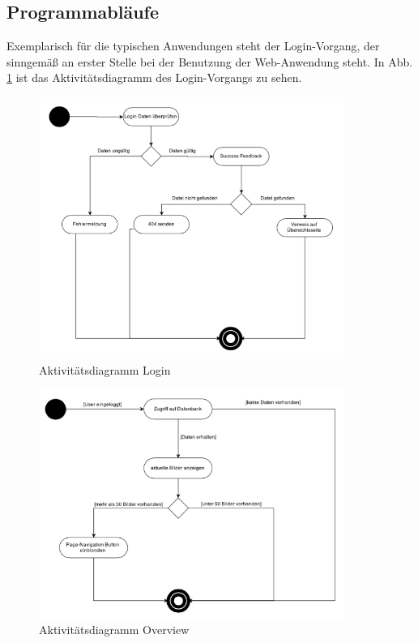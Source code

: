 \documentclass[12pt, oneside, a4paper]{article}		%
\begin{document}
\subsection{Programmabläufe}

Exemplarisch für die typischen Anwendungen steht der Login-Vorgang, der sinngemäß an erster Stelle bei der Benutzung der Web-Anwendung steht. In Abb. \ref{AcitivityDiagramLogin} ist das Aktivitätsdiagramm des Login-Vorgangs zu sehen.

\begin{figure}[H]
	\centering
	\includegraphics[width=10cm]{footage/ZIMG_ActivityDiagram_Login} 
	\caption{Aktivitätsdiagramm Login}
	\label{AcitivityDiagramLogin}
\end{figure}

\begin{figure}[H]
	\centering
	\includegraphics[width=10cm]{footage/ZIMG_ActivityDiagram_Overview} 
	\caption{Aktivitätsdiagramm Overview}
	\label{AcitivityDiagramOverview}
\end{figure}
\end{document}

